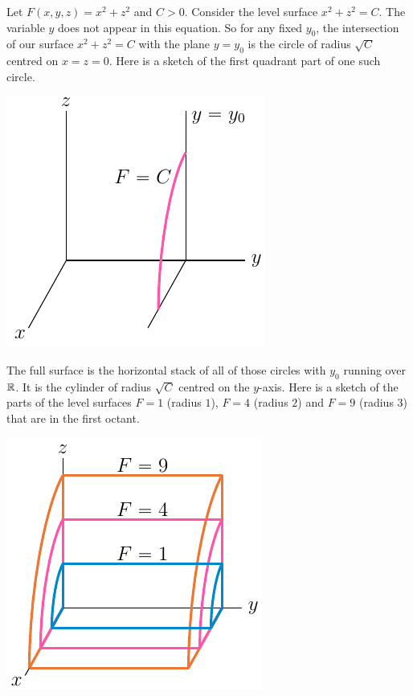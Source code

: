 \bigskip\goodbreak
\begin{eg}[$F(x,y,z)=x^2+z^2$]\label{eg level surface cylinder}
Let $F(x,y,z)=x^2+z^2$ and $C>0$. Consider the level surface
$x^2+z^2=C$.  The variable $y$ does not appear in this equation. 
So for any fixed $y_0$, the intersection of our surface
$x^2+z^2=C$ with the plane $y=y_0$ is the circle of radius $\sqrt{C}$
centred on $x=z=0$. Here is a sketch of the first quadrant part of
one such circle.
\begin{efig}
\begin{center}
   \includegraphics{cylB.pdf}
\end{center}
\end{efig}
The full surface is the horizontal stack of all of those
circles with $y_0$ running over $\mathbb{R}$. It is the cylinder of radius  
$\sqrt{C}$ centred on the $y$-axis.
Here is a sketch of the parts of the level surfaces 
           $F=1$ (radius $1$), 
           $F=4$ (radius $2$) and 
           $F=9$ (radius $3$)
that are in the first octant.
\begin{efig}
\begin{center}
   \includegraphics{cylA.pdf}
\end{center}
\end{efig}
\end{eg}

